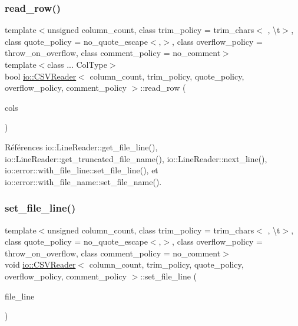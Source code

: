\subsubsection{\texorpdfstring{read\+\_\+row()}{read\_row()}}
{\footnotesize\ttfamily template$<$unsigned column\+\_\+count, class trim\+\_\+policy  = trim\+\_\+chars$<$\textquotesingle{} \textquotesingle{}, \textquotesingle{}\textbackslash{}t\textquotesingle{}$>$, class quote\+\_\+policy  = no\+\_\+quote\+\_\+escape$<$\textquotesingle{},\textquotesingle{}$>$, class overflow\+\_\+policy  = throw\+\_\+on\+\_\+overflow, class comment\+\_\+policy  = no\+\_\+comment$>$ \\
template$<$class ... Col\+Type$>$ \\
bool \hyperlink{classio_1_1CSVReader}{io\+::\+C\+S\+V\+Reader}$<$ column\+\_\+count, trim\+\_\+policy, quote\+\_\+policy, overflow\+\_\+policy, comment\+\_\+policy $>$\+::read\+\_\+row (\begin{DoxyParamCaption}\item[{Col\+Type \&...}]{cols }\end{DoxyParamCaption})\hspace{0.3cm}{\ttfamily [inline]}}



Références io\+::\+Line\+Reader\+::get\+\_\+file\+\_\+line(), io\+::\+Line\+Reader\+::get\+\_\+truncated\+\_\+file\+\_\+name(), io\+::\+Line\+Reader\+::next\+\_\+line(), io\+::error\+::with\+\_\+file\+\_\+line\+::set\+\_\+file\+\_\+line(), et io\+::error\+::with\+\_\+file\+\_\+name\+::set\+\_\+file\+\_\+name().

\mbox{\label{classio_1_1CSVReader_a1303bd6a2eb0d3d7c743212e52839ac4}} 
\subsubsection{\texorpdfstring{set\+\_\+file\+\_\+line()}{set\_file\_line()}}
{\footnotesize\ttfamily template$<$unsigned column\+\_\+count, class trim\+\_\+policy  = trim\+\_\+chars$<$\textquotesingle{} \textquotesingle{}, \textquotesingle{}\textbackslash{}t\textquotesingle{}$>$, class quote\+\_\+policy  = no\+\_\+quote\+\_\+escape$<$\textquotesingle{},\textquotesingle{}$>$, class overflow\+\_\+policy  = throw\+\_\+on\+\_\+overflow, class comment\+\_\+policy  = no\+\_\+comment$>$ \\
void \hyperlink{classio_1_1CSVReader}{io\+::\+C\+S\+V\+Reader}$<$ column\+\_\+count, trim\+\_\+policy, quote\+\_\+policy, overflow\+\_\+policy, comment\+\_\+policy $>$\+::set\+\_\+file\+\_\+line (\begin{DoxyParamCaption}\item[{unsigned}]{file\+\_\+line }\end{DoxyParamCaption})\hspace{0.3cm}{\ttfamily [inline]}}



